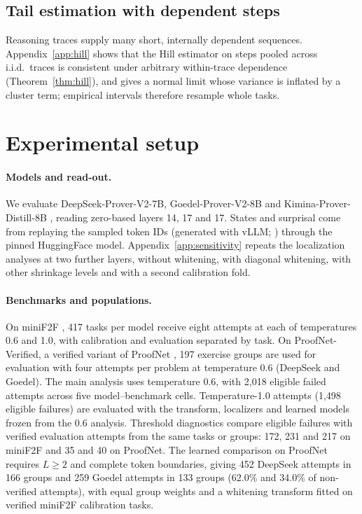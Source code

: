 \documentclass{article}
\newcommand{\1}{\mathbf{1}}
\begin{document}
\subsection{Tail estimation with dependent steps}

Reasoning traces supply many short, internally dependent sequences. Appendix~\ref{app:hill} shows that the Hill estimator on steps pooled across i.i.d.\ traces is consistent under arbitrary within-trace dependence (Theorem~\ref{thm:hill}), and gives a normal limit whose variance is inflated by a cluster term; empirical intervals therefore resample whole tasks.

\section{Experimental setup}\label{sec:setup}

\paragraph{Models and read-out.} We evaluate DeepSeek-Prover-V2-7B, Goedel-Prover-V2-8B and Kimina-Prover-Distill-8B \citep{ren2025,lin2025,wang2025}, reading zero-based layers 14, 17 and 17. States and surprisal come from replaying the sampled token IDs (generated with vLLM; \citealp{kwon2023}) through the pinned HuggingFace model. Appendix~\ref{app:sensitivity} repeats the localization analyses at two further layers, without whitening, with diagonal whitening, with other shrinkage levels and with a second calibration fold.

\paragraph{Benchmarks and populations.} On miniF2F \citep{zheng2022}, 417 tasks per model receive eight attempts at each of temperatures 0.6 and 1.0, with calibration and evaluation separated by task. On ProofNet-Verified, a verified variant of ProofNet \citep{azerbayev2023}, 197 exercise groups are used for evaluation with four attempts per problem at temperature 0.6 (DeepSeek and Goedel). The main analysis uses temperature 0.6, with 2,018 eligible failed attempts across five model--benchmark cells. Temperature-1.0 attempts (1,498 eligible failures) are evaluated with the transform, localizers and learned models frozen from the 0.6 analysis. Threshold diagnostics compare eligible failures with verified evaluation attempts from the same tasks or groups: 172, 231 and 217 on miniF2F and 35 and 40 on ProofNet. The learned comparison on ProofNet requires $L\ge2$ and complete token boundaries, giving 452 DeepSeek attempts in 166 groups and 259 Goedel attempts in 133 groups (62.0\% and 34.0\% of non-verified attempts), with equal group weights and a whitening transform fitted on verified miniF2F calibration tasks.
\end{document}
